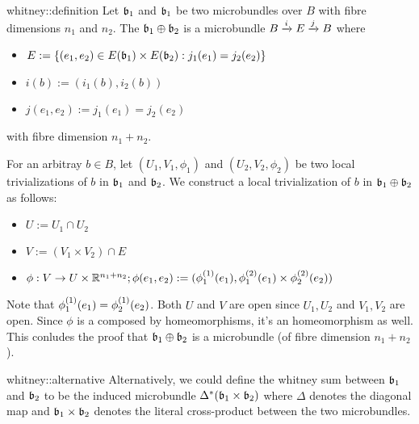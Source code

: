 \begin{mydefinition}{whitney::definition}
    Let $\bb_1$ and $\bb_1$ be two microbundles over $B$ with fibre dimensions $n_1$ and $n_2$.
    The  $\whitney{\bb_1}{\bb_2}$ is a microbundle $\bundle{B}{E}{i}{j}$ where
    \begin{itemize}
        \item $E := \set{ (e_1, e_2) \in E(\bb_1) \times E(\bb_2)}{j_1(e_1) = j_2(e_2)}$
        \item $i(b) := (i_1(b), i_2(b))$
        \item $j(e_1, e_2) := j_1(e_1) = j_2(e_2)$
    \end{itemize}
    with fibre dimension $n_1 + n_2$.
\end{mydefinition}

\begin{myproof}
    For an arbitray $b \in B$, let $(U_1, V_1, \phi_1)$ and $(U_2, V_2, \phi_2)$
    be two local trivializations of $b$ in $\bb_1$ and $\bb_2$.
    We construct a local trivialization of $b$ in $\whitney{\bb_1}{\bb_2}$ as follows:
    \begin{itemize}
        \item $U := U_1 \cap U_2$
        \item $V := (V_1 \times V_2) \cap E$
        \item $\phi: V \to U \times \R^{n_1 + n_2}; \phi(e_1, e_2) := (\frst{\phi_1}(e_1), \snd{\phi_1}(e_1) \times  \snd{\phi_2}(e_2))$
    \end{itemize}
    Note that $\frst{\phi_1}(e_1) = \frst{\phi_2}(e_2)$.
    Both $U$ and $V$ are open since $U_1, U_2$ and $V_1, V_2$ are open.
    Since $\phi$ is a composed by homeomorphisms, it's an homeomorphism as well.
    This conludes the proof that $\whitney{\bb_1}{\bb_2}$ is a microbundle (of fibre dimension $n_1 + n_2$).
\end{myproof}

\begin{myremark}{whitney::alternative}
    Alternatively, we could define the whitney sum between $\bb_1$ and $\bb_2$
    to be the induced microbundle $\ind{\Delta}(\bb_1 \times \bb_2)$
    where $\Delta$ denotes the diagonal map and $\bb_1 \times \bb_2$
    denotes the literal cross-product between the two microbundles.
\end{myremark}